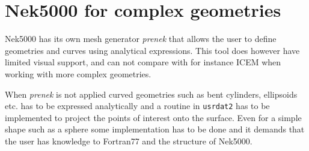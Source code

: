 


\section{Nek5000 for complex geometries}
Nek5000 has its own mesh generator \textit{prenek} that allows the user to define geometries 
and curves using analytical expressions. This tool does however have limited visual support, and
can not compare with for instance ICEM when working with more complex geometries. 

When \textit{prenek } is not applied curved geometries such as bent cylinders, ellipsoids etc.
has to be expressed analytically and a routine
in \verb|usrdat2| has to be implemented to project the points of interest onto the surface.
Even for a simple shape such as a sphere some implementation has to be done and it 
demands that the user has knowledge to Fortran77 and the structure of Nek5000.

